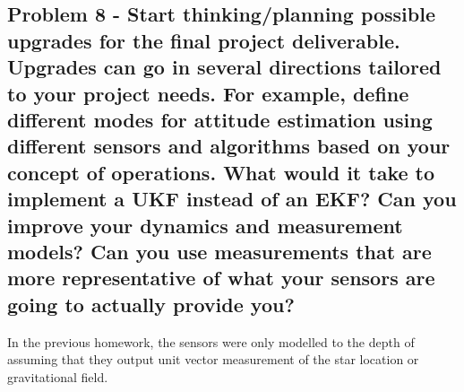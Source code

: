\subsection{Problem 8 - Start thinking/planning possible upgrades for the final project deliverable. Upgrades can go in several directions tailored to your project needs. For example, define different modes for attitude estimation using different sensors and algorithms based on your concept of operations. What would it take to implement a UKF instead of an EKF? Can you improve your dynamics and measurement models? Can you use measurements that are more representative of what your sensors are going to actually provide you?}

In the previous homework, the sensors were only modelled to the depth of assuming that they output unit vector measurement of the star location or gravitational field. 